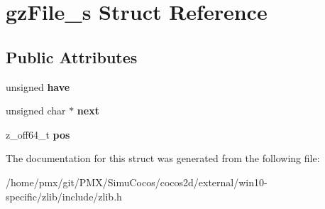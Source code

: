 \hypertarget{structgzFile__s}{}\section{gz\+File\+\_\+s Struct Reference}
\label{structgzFile__s}
\subsection*{Public Attributes}
\begin{DoxyCompactItemize}
\item 
\mbox{\label{structgzFile__s_abb96e208e17a991c09b4df6cefcc1c04}} 
unsigned {\bfseries have}
\item 
\mbox{\label{structgzFile__s_aa5e3e3da0143cde8f92ddfd6996d55fc}} 
unsigned char $\ast$ {\bfseries next}
\item 
\mbox{\label{structgzFile__s_a98038b7edb4ab55ee321fa388afb687e}} 
z\+\_\+off64\+\_\+t {\bfseries pos}
\end{DoxyCompactItemize}


The documentation for this struct was generated from the following file\+:\begin{DoxyCompactItemize}
\item 
/home/pmx/git/\+P\+M\+X/\+Simu\+Cocos/cocos2d/external/win10-\/specific/zlib/include/zlib.\+h\end{DoxyCompactItemize}
